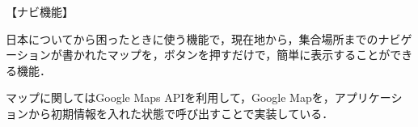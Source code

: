 【ナビ機能】
\par 日本についてから困ったときに使う機能で，現在地から，集合場所までのナビゲーションが書かれたマップを，ボタンを押すだけで，簡単に表示することができる機能．
\par マップに関してはGoogle Maps APIを利用して，Google Mapを，アプリケーションから初期情報を入れた状態で呼び出すことで実装している．
